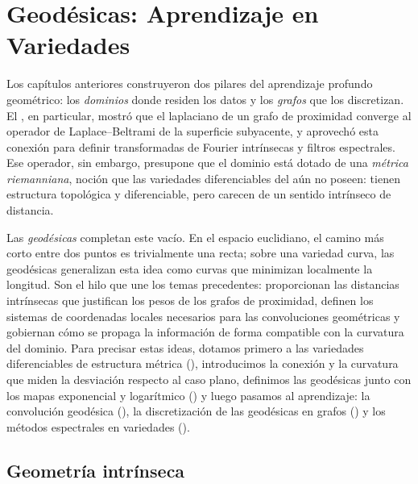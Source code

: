 \providecommand{\Ric}{\operatorname{Ric}}
\providecommand{\divergence}{\operatorname{div}}
\providecommand{\grad}{\operatorname{grad}}
\providecommand{\Exp}{\operatorname{exp}}
\providecommand{\Log}{\operatorname{log}}
\providecommand{\TpM}{T_p\mathcal{M}}
\providecommand{\M}{\mathcal{M}}
\providecommand{\N}{\mathbb{N}}

\chapter{Geod\'esicas: Aprendizaje en Variedades}
\label{ch:geodesics}

Los cap\'itulos anteriores construyeron dos pilares del aprendizaje profundo
geom\'etrico: los \emph{dominios} donde residen los datos y los \emph{grafos}
que los discretizan. El , en particular, mostr\'o que el
laplaciano de un grafo de proximidad converge al operador de Laplace--Beltrami
de la superficie subyacente, y aprovech\'o esta conexi\'on para definir
transformadas de Fourier intr\'insecas y filtros espectrales. Ese operador, sin
embargo, presupone que el dominio est\'a dotado de una \emph{m\'etrica
riemanniana}, noci\'on que las variedades diferenciables del
 a\'un no poseen: tienen estructura topol\'ogica y
diferenciable, pero carecen de un sentido intr\'inseco de distancia.

Las \emph{geod\'esicas} completan este vac\'io. En el espacio euclidiano, el
camino m\'as corto entre dos puntos es trivialmente una recta; sobre una
variedad curva, las geod\'esicas generalizan esta idea como curvas que minimizan
localmente la longitud. Son el hilo que une los temas precedentes: proporcionan
las distancias intr\'insecas que justifican los pesos de los grafos de
proximidad, definen los sistemas de coordenadas locales necesarios para las
convoluciones geom\'etricas y gobiernan c\'omo se propaga la informaci\'on de
forma compatible con la curvatura del dominio. Para precisar estas ideas,
dotamos primero a las variedades diferenciables de estructura m\'etrica
(), introducimos la conexi\'on y la curvatura que miden
la desviaci\'on respecto al caso plano, definimos las geod\'esicas junto con los
mapas exponencial y logar\'itmico () y luego pasamos al
aprendizaje: la convoluci\'on geod\'esica (), la
discretizaci\'on de las geod\'esicas en grafos () y los
m\'etodos espectrales en variedades ().

\section{Geometr\'ia intr\'inseca}
\label{sec:geo:intrinsic}

